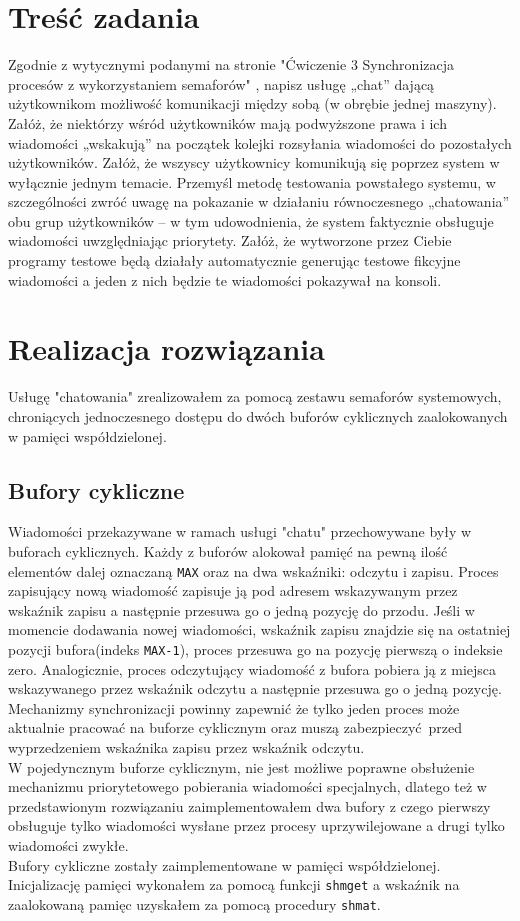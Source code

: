\documentclass{mwrep}
\begin{document}
\chapter{Treść zadania}
Zgodnie z wytycznymi podanymi na stronie "Ćwiczenie 3
Synchronizacja procesów z wykorzystaniem semaforów" , napisz usługę „chat”
dającą użytkownikom możliwość komunikacji między sobą (w obrębie jednej maszyny).
Załóż, że niektórzy wśród użytkowników mają podwyższone prawa i ich wiadomości
„wskakują” na początek kolejki rozsyłania wiadomości do pozostałych użytkowników.
Załóż, że wszyscy użytkownicy komunikują się poprzez system w wyłącznie jednym temacie.
Przemyśl metodę testowania powstałego systemu, w szczególności zwróć uwagę na
pokazanie w działaniu równoczesnego „chatowania” obu grup użytkowników – w tym
udowodnienia, że system faktycznie obsługuje wiadomości uwzględniając priorytety.
Załóż, że wytworzone przez Ciebie programy testowe będą działały automatycznie
generując testowe fikcyjne wiadomości a jeden z nich będzie te
wiadomości pokazywał na konsoli.

\chapter{Realizacja rozwiązania}
Usługę "chatowania" zrealizowałem za pomocą zestawu semaforów systemowych,
chroniących jednoczesnego dostępu do dwóch buforów cyklicznych zaalokowanych
w pamięci współdzielonej.

\section{Bufory cykliczne}
Wiadomości przekazywane w ramach usługi "chatu" przechowywane były w buforach cyklicznych.
Każdy z buforów alokował pamięć na pewną ilość elementów dalej oznaczaną \texttt{MAX} oraz na dwa wskaźniki: odczytu i zapisu.
Proces zapisujący nową wiadomość zapisuje ją pod adresem wskazywanym przez wskaźnik zapisu a następnie
przesuwa go o jedną pozycję do przodu. Jeśli w momencie dodawania nowej wiadomości, wskaźnik zapisu
znajdzie się na ostatniej pozycji bufora(indeks \texttt{MAX-1}), proces przesuwa go na pozycję pierwszą o indeksie zero.
Analogicznie, proces odczytujący wiadomość z bufora pobiera ją z miejsca wskazywanego przez wskaźnik
odczytu a następnie przesuwa go o jedną pozycję. Mechanizmy synchronizacji powinny zapewnić że tylko jeden
proces może aktualnie pracować na buforze cyklicznym oraz muszą zabezpieczyć przed wyprzedzeniem wskaźnika zapisu
przez wskaźnik odczytu.\\ 
\indent W pojedyncznym buforze cyklicznym, nie jest możliwe poprawne obsłużenie mechanizmu priorytetowego pobierania
wiadomości specjalnych, dlatego też w przedstawionym rozwiązaniu zaimplementowałem dwa bufory z czego pierwszy
obsługuje tylko wiadomości wysłane przez procesy uprzywilejowane a drugi tylko wiadomości zwykłe.\\
\indent Bufory cykliczne zostały zaimplementowane w pamięci współdzielonej. Inicjalizację pamięci
wykonałem za pomocą funkcji \texttt{shmget} a wskaźnik na zaalokowaną pamięc uzyskałem za pomocą procedury \texttt{shmat}.
\end{document}
